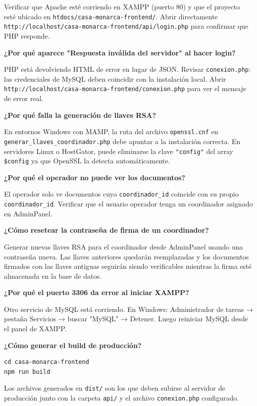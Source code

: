 \documentclass[10pt,letterpaper]{report}
\begin{document}
Verificar que Apache esté corriendo en XAMPP (puerto 80) y que el proyecto esté ubicado en \texttt{htdocs/casa-monarca-frontend/}. Abrir directamente \texttt{http://localhost/casa-monarca-frontend/api/login.php} para confirmar que PHP responde.

\textbf{¿Por qué aparece "Respuesta inválida del servidor" al hacer login?}

PHP está devolviendo HTML de error en lugar de JSON. Revisar \texttt{conexion.php}: las credenciales de MySQL deben coincidir con la instalación local. Abrir \texttt{http://localhost/casa-monarca-frontend/conexion.php} para ver el mensaje de error real.

\textbf{¿Por qué falla la generación de llaves RSA?}

En entornos Windows con MAMP, la ruta del archivo \texttt{openssl.cnf} en \texttt{generar\_llaves\_coordinador.php} debe apuntar a la instalación correcta. En servidores Linux o HostGator, puede eliminarse la clave \texttt{"config"} del array \texttt{\$config} ya que OpenSSL la detecta automáticamente.

\textbf{¿Por qué el operador no puede ver los documentos?}

El operador solo ve documentos cuyo \texttt{coordinador\_id} coincide con su propio \texttt{coordinador\_id}. Verificar que el usuario operador tenga un coordinador asignado en AdminPanel.

\textbf{¿Cómo resetear la contraseña de firma de un coordinador?}

Generar nuevas llaves RSA para el coordinador desde AdminPanel usando una contraseña nueva. Las llaves anteriores quedarán reemplazadas y los documentos firmados con las llaves antiguas seguirán siendo verificables mientras la firma esté almacenada en la base de datos.

\textbf{¿Por qué el puerto 3306 da error al iniciar XAMPP?}

Otro servicio de MySQL está corriendo. En Windows: Administrador de tareas → pestaña Servicios → buscar "MySQL" → Detener. Luego reiniciar MySQL desde el panel de XAMPP.

\textbf{¿Cómo generar el build de producción?}

\begin{lstlisting}[style=bashstyle]
cd casa-monarca-frontend
npm run build
\end{lstlisting}

Los archivos generados en \texttt{dist/} son los que deben subirse al servidor de producción junto con la carpeta \texttt{api/} y el archivo \texttt{conexion.php} configurado.
\end{document}
